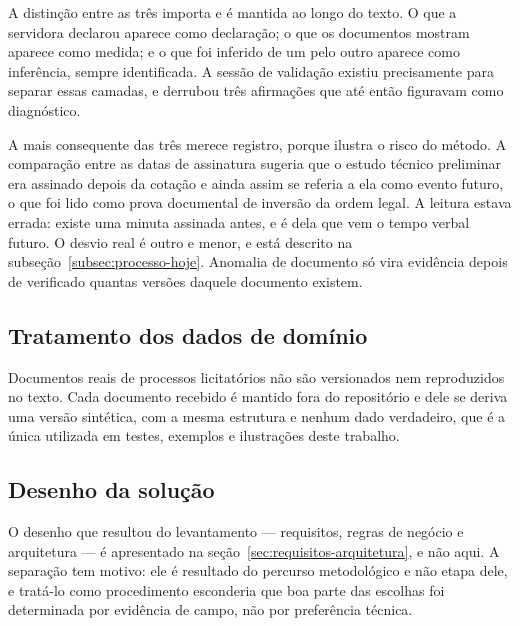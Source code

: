 A distinção entre as três importa e é mantida ao longo do texto. O que a
servidora declarou aparece como declaração; o que os documentos mostram aparece
como medida; e o que foi inferido de um pelo outro aparece como inferência,
sempre identificada. A sessão de validação existiu precisamente para separar
essas camadas, e derrubou três afirmações que até então figuravam como
diagnóstico.

A mais consequente das três merece registro, porque ilustra o risco do método.
A comparação entre as datas de assinatura sugeria que o estudo técnico
preliminar era assinado depois da cotação e ainda assim se referia a ela como
evento futuro, o que foi lido como prova documental de inversão da ordem legal.
A leitura estava errada: existe uma minuta assinada antes, e é dela que vem o
tempo verbal futuro. O desvio real é outro e menor, e está descrito na
subseção~\ref{subsec:processo-hoje}. Anomalia de documento só vira evidência
depois de verificado quantas versões daquele documento existem.


\subsection{Tratamento dos dados de domínio}

Documentos reais de processos licitatórios não são versionados nem reproduzidos
no texto. Cada documento recebido é mantido fora do repositório e dele se deriva
uma versão sintética, com a mesma estrutura e nenhum dado verdadeiro, que é a
única utilizada em testes, exemplos e ilustrações deste trabalho.


\subsection{Desenho da solução}

O desenho que resultou do levantamento --- requisitos, regras de negócio e
arquitetura --- é apresentado na seção~\ref{sec:requisitos-arquitetura}, e não
aqui. A separação tem motivo: ele é resultado do percurso metodológico e não
etapa dele, e tratá-lo como procedimento esconderia que boa parte das escolhas
foi determinada por evidência de campo, não por preferência técnica.

